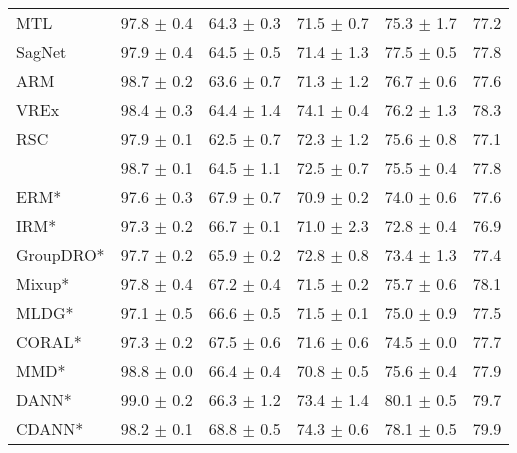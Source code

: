 \begin{table*}
\begin{center}
\begin{tabular}{lccccc}
MTL                  & 97.8 $\pm$ 0.4       & 64.3 $\pm$ 0.3       & 71.5 $\pm$ 0.7       & 75.3 $\pm$ 1.7       & 77.2                 \\
SagNet               & 97.9 $\pm$ 0.4       & 64.5 $\pm$ 0.5       & 71.4 $\pm$ 1.3       & 77.5 $\pm$ 0.5       & 77.8                 \\
ARM                  & 98.7 $\pm$ 0.2       & 63.6 $\pm$ 0.7       & 71.3 $\pm$ 1.2       & 76.7 $\pm$ 0.6       & 77.6                 \\
VREx                 & 98.4 $\pm$ 0.3       & 64.4 $\pm$ 1.4       & 74.1 $\pm$ 0.4       & 76.2 $\pm$ 1.3       & 78.3                 \\
RSC                  & 97.9 $\pm$ 0.1       & 62.5 $\pm$ 0.7       & 72.3 $\pm$ 1.2       & 75.6 $\pm$ 0.8       & 77.1                 \\
\divcams 	   & 98.7 $\pm$ 0.1       & 64.5 $\pm$ 1.1        & 72.5 $\pm$ 0.7       & 75.5 $\pm$ 0.4       & 77.8                \\
\midrule
ERM*                  & 97.6 $\pm$ 0.3       & 67.9 $\pm$ 0.7       & 70.9 $\pm$ 0.2       & 74.0 $\pm$ 0.6       & 77.6                 \\
IRM*                  & 97.3 $\pm$ 0.2       & 66.7 $\pm$ 0.1       & 71.0 $\pm$ 2.3       & 72.8 $\pm$ 0.4       & 76.9                 \\
GroupDRO*             & 97.7 $\pm$ 0.2       & 65.9 $\pm$ 0.2       & 72.8 $\pm$ 0.8       & 73.4 $\pm$ 1.3       & 77.4                 \\
Mixup*                & 97.8 $\pm$ 0.4       & 67.2 $\pm$ 0.4       & 71.5 $\pm$ 0.2       & 75.7 $\pm$ 0.6       & 78.1                 \\
MLDG*                 & 97.1 $\pm$ 0.5       & 66.6 $\pm$ 0.5       & 71.5 $\pm$ 0.1       & 75.0 $\pm$ 0.9       & 77.5                 \\
CORAL*                & 97.3 $\pm$ 0.2       & 67.5 $\pm$ 0.6       & 71.6 $\pm$ 0.6       & 74.5 $\pm$ 0.0       & 77.7                 \\
MMD*                  & 98.8 $\pm$ 0.0       & 66.4 $\pm$ 0.4       & 70.8 $\pm$ 0.5       & 75.6 $\pm$ 0.4       & 77.9                 \\
DANN*                 & 99.0 $\pm$ 0.2       & 66.3 $\pm$ 1.2       & 73.4 $\pm$ 1.4       & 80.1 $\pm$ 0.5       & 79.7                 \\
CDANN*                & 98.2 $\pm$ 0.1       & 68.8 $\pm$ 0.5       & 74.3 $\pm$ 0.6       & 78.1 $\pm$ 0.5       & 79.9                 \\

\end{tabular}
\end{center}
\end{table*}
